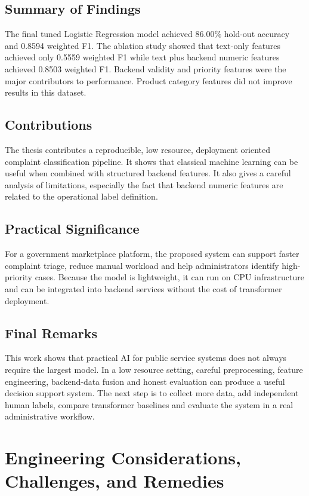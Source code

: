 \documentclass[12pt,a4paper,openany]{book}
\begin{document}
\section{Summary of Findings}
The final tuned Logistic Regression model achieved 86.00\% hold-out accuracy and 0.8594 weighted F1. The ablation study showed that text-only features achieved only 0.5559 weighted F1 while text plus backend numeric features achieved 0.8503 weighted F1. Backend validity and priority features were the major contributors to performance. Product category features did not improve results in this dataset.

\section{Contributions}
The thesis contributes a reproducible, low resource, deployment oriented complaint classification pipeline. It shows that classical machine learning can be useful when combined with structured backend features. It also gives a careful analysis of limitations, especially the fact that backend numeric features are related to the operational label definition.

\section{Practical Significance}
For a government marketplace platform, the proposed system can support faster complaint triage, reduce manual workload and help administrators identify high-priority cases. Because the model is lightweight, it can run on CPU infrastructure and can be integrated into backend services without the cost of transformer deployment.

\section{Final Remarks}
This work shows that practical AI for public service systems does not always require the largest model. In a low resource setting, careful preprocessing, feature engineering, backend-data fusion and honest evaluation can produce a useful decision support system. The next step is to collect more data, add independent human labels, compare transformer baselines and evaluate the system in a real administrative workflow.

\chapter{Engineering Considerations, Challenges, and Remedies}
\end{document}
